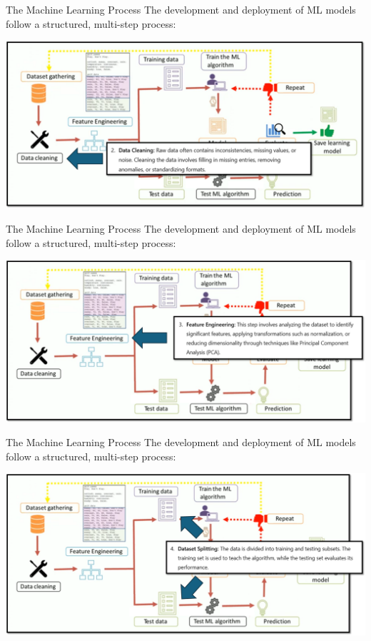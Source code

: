 \documentclass[11pt]{beamer}
\begin{document}
\begin{frame}{The Machine Learning Process}
The development and deployment of ML models follow a structured, multi-step process:

	\begin{center}
	\includegraphics[scale=0.4]{../05-pictures/lesson-1-1_pic_13.png}
	\end{center}
\end{frame}
\begin{frame}{The Machine Learning Process}
The development and deployment of ML models follow a structured, multi-step process:

	\begin{center}
	\includegraphics[scale=0.39]{../05-pictures/lesson-1-1_pic_14.png}
	\end{center}
\end{frame}
\begin{frame}{The Machine Learning Process}
The development and deployment of ML models follow a structured, multi-step process:

	\begin{center}
	\includegraphics[scale=0.39]{../05-pictures/lesson-1-1_pic_15.png}
	\end{center}
\end{frame}
\end{document}
